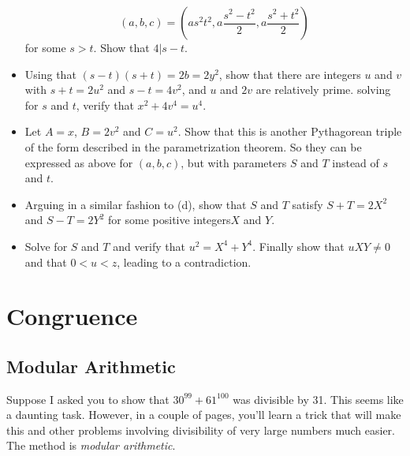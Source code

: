 \documentclass[11pt,dvipsnames]{book}
\numberwithin{equation}{section} %
\numberwithin{figure}{section} %
\numberwithin{table}{section} %
\begin{document}
\begin{exercise}
\begin{exercise}
\begin{itemize}
\[
(a,b,c) = \left( as^2 t^2, a\frac{s^2-t^2}{2}, a\frac{s^{2}+t^{2}}{2}\right)
\]
for some $s>t$. Show that $4|s-t$. 
\item Using that $(s-t)(s+t)=2b=2y^2$, show that there are integers $u$ and $v$ with $s+t = 2u^2$ and $s-t=4v^2$, and $u$ and $2v$ are relatively prime. solving for $s$ and $t$, verify that $x^2+4v^4 = u^4$.
\item Let $A = x$, $B = 2v^2$ and $C = u^2$. Show that this is another Pythagorean triple of the form described in the parametrization theorem. So they can be expressed as above for $(a,b,c)$, but with parameters $S$ and $T$ instead of $s$ and $t$.
\item Arguing in a similar fashion to (d), show that $S$ and $T$ satisfy $S+T = 2X^2$ and $S-T=2Y^2$ for some positive integers$ X$ and $Y$.
\item Solve for $S$ and $T$ and verify that $u^2 = X^4 + Y^4$. Finally show that $uXY\neq 0$ and that $0 < u < z$, leading to a contradiction.
\end{itemize}  

\end{exercise}












\part{Congruence}




\chapter{Modular Arithmetic}


%





Suppose I asked you to show that $30^{99}+61^{100}$ was divisible by 31. This seems like a daunting task. However, in a couple of pages, you'll learn a trick that will make this and other problems involving divisibility of very large numbers much easier. The method is {\it modular arithmetic}.  


\end{exercise}
\end{document}
